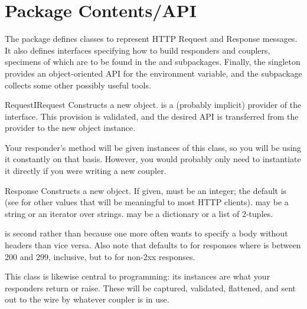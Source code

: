\chapter{Package Contents/API \label{api}}

The  package defines classes to represent HTTP Request and
Response messages. It also defines interfaces specifying how to build responders
and couplers, specimens of which are to be found in the  and
 subpackages. Finally, the  singleton provides an
object-oriented API for the  environment variable, and the
 subpackage collects some other possibly useful tools.


\begin{classdesc}{Request}{IRequest}
Constructs a new  object.  is a (probably implicit)
provider of the  interface. This provision is validated, and the
desired API is transferred from the  provider to the new object
instance.

Your responder's  method will be given instances of this class,
so you will be using it constantly on that basis. However, you would probably
only need to instantiate it directly if you were writing a new coupler.
\end{classdesc}


\begin{classdesc}{Response}{  }
Constructs a new  object. If given,  must be an
integer; the default is
(see  for other values that will be meaningful to most HTTP clients). 
may be a string or an iterator over strings.  may be a dictionary
or a list of 2-tuples.

 is second rather than  because one more often wants to
specify a body without headers than vice versa. Also note that
 defaults to  for responses where
 is between 200 and 299, inclusive, but to  for
non-2xx responses.

This class is likewise central to  programming: its instances are
what your responders return or raise. These will be captured, validated,
flattened, and sent out to the wire by whatever coupler is in use.
\end{classdesc}









